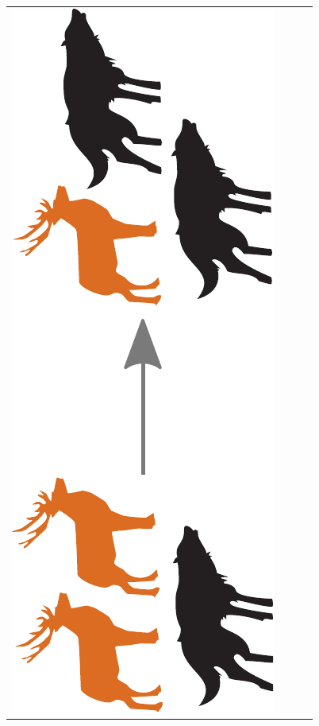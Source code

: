\documentclass[12pt]{beamer}
\begin{document}
\begin{frame}
\begin{itemize}
\begin{tabular}{ r c c c }
      \includegraphics[scale=0.15,angle=-90,origin=c]{Bilder/lv_mix.pdf}
      &

\end{tabular}
\end{itemize}
\end{frame}
\end{document}
